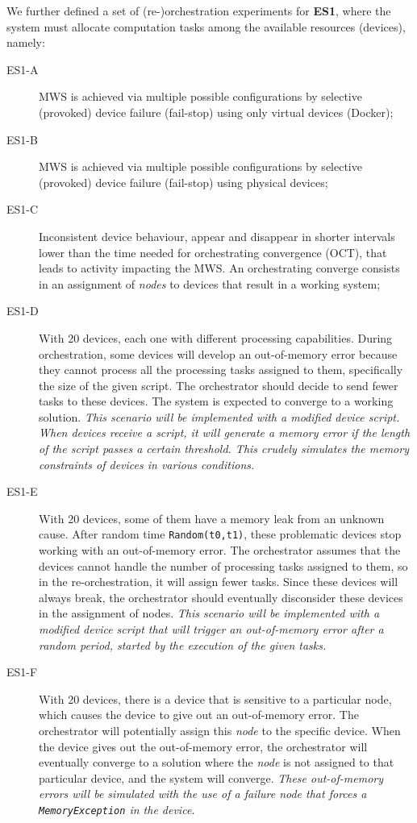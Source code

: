 We further defined a set of (re-)orchestration experiments for \textbf{ES1}, where the system must allocate computation tasks among the available resources (\ie devices), namely:
\begin{description}
    \item[ES1-A] MWS is achieved via multiple possible configurations by selective (provoked) device failure (fail-stop) using only virtual devices (\ie Docker);
    \item[ES1-B] MWS is achieved via multiple possible configurations by selective (provoked) device failure (fail-stop) using physical devices;
    \item[ES1-C] Inconsistent device behaviour, \eg appear and disappear in shorter intervals lower than the time needed for orchestrating convergence (OCT), that leads to activity impacting the MWS. An orchestrating converge consists in an assignment of \textit{nodes} to devices that result in a working system; 
    \item[ES1-D] With 20 devices, each one with different processing capabilities. During orchestration, some devices will develop an out-of-memory error because they cannot process all the processing tasks assigned to them, specifically the size of the given script. The orchestrator should decide to send fewer tasks to these devices. The system is expected to converge to a working solution. \textit{This scenario will be implemented with a modified device script. When devices receive a script, it will generate a memory error if the length of the script passes a certain threshold. This crudely simulates the memory constraints of devices in various conditions.}
    \item[ES1-E] With 20 devices, some of them have a memory leak from an unknown cause. After random time \texttt{Random(t0,t1)}, these problematic devices stop working with an out-of-memory error. The orchestrator assumes that the devices cannot handle the number of processing tasks assigned to them, so in the re-orchestration, it will assign fewer tasks. Since these devices will always break, the orchestrator should eventually disconsider these devices in the assignment of nodes. \textit{This scenario will be implemented with a modified device script that will trigger an out-of-memory error after a random period, started by the execution of the given tasks.}
    \item[ES1-F] With 20 devices, there is a device that is sensitive to a particular node, which causes the device to give out an out-of-memory error. The orchestrator will potentially assign this \textit{node} to the specific device. When the device gives out the out-of-memory error, the orchestrator will eventually converge to a solution where the \textit{node} is not assigned to that particular device, and the system will converge.  \textit{These out-of-memory errors will be simulated with the use of a failure \textit{node} that forces a \texttt{MemoryException} in the device.}

\end{description}
